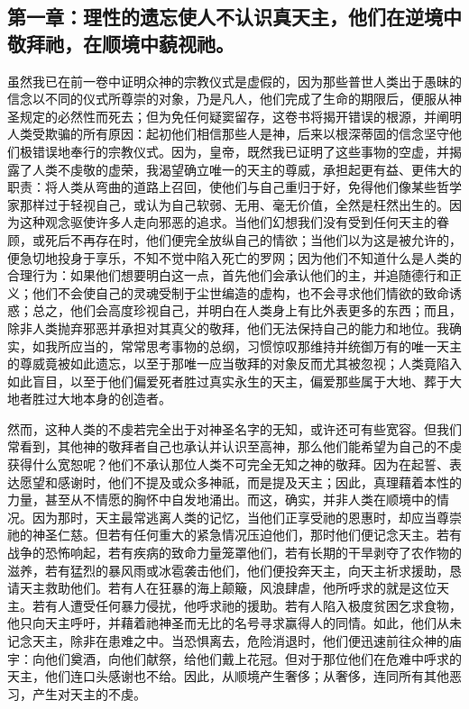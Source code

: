 \subsection{第一章：理性的遗忘使人不认识真天主，他们在逆境中敬拜祂，在顺境中藐视祂。}

虽然我已在前一卷中证明众神的宗教仪式是虚假的，因为那些普世人类出于愚昧的信念以不同的仪式所尊崇的对象，乃是凡人，他们完成了生命的期限后，便服从神圣规定的必然性而死去；但为免任何疑窦留存，这卷书将揭开错误的根源，并阐明人类受欺骗的所有原因：起初他们相信那些人是神，后来以根深蒂固的信念坚守他们极错误地奉行的宗教仪式。因为，皇帝，既然我已证明了这些事物的空虚，并揭露了人类不虔敬的虚荣，我渴望确立唯一的天主的尊威，承担起更有益、更伟大的职责：将人类从弯曲的道路上召回，使他们与自己重归于好，免得他们像某些哲学家那样过于轻视自己，或认为自己软弱、无用、毫无价值，全然是枉然出生的。因为这种观念驱使许多人走向邪恶的追求。当他们幻想我们没有受到任何天主的眷顾，或死后不再存在时，他们便完全放纵自己的情欲；当他们以为这是被允许的，便急切地投身于享乐，不知不觉中陷入死亡的罗网；因为他们不知道什么是人类的合理行为：如果他们想要明白这一点，首先他们会承认他们的主，并追随德行和正义；他们不会使自己的灵魂受制于尘世编造的虚构，也不会寻求他们情欲的致命诱惑；总之，他们会高度珍视自己，并明白在人类身上有比外表更多的东西；而且，除非人类抛弃邪恶并承担对其真父的敬拜，他们无法保持自己的能力和地位。我确实，如我所应当的，常常思考事物的总纲，习惯惊叹那维持并统御万有的唯一天主的尊威竟被如此遗忘，以至于那唯一应当敬拜的对象反而尤其被忽视；人类竟陷入如此盲目，以至于他们偏爱死者胜过真实永生的天主，偏爱那些属于大地、葬于大地者胜过大地本身的创造者。\par

然而，这种人类的不虔若完全出于对神圣名字的无知，或许还可有些宽容。但我们常看到，其他神的敬拜者自己也承认并认识至高神，那么他们能希望为自己的不虔获得什么宽恕呢？他们不承认那位人类不可完全无知之神的敬拜。因为在起誓、表达愿望和感谢时，他们不提及或众多神祇，而是提及天主；因此，真理藉着本性的力量，甚至从不情愿的胸怀中自发地涌出。而这，确实，并非人类在顺境中的情况。因为那时，天主最常逃离人类的记忆，当他们正享受祂的恩惠时，却应当尊崇祂的神圣仁慈。但若有任何重大的紧急情况压迫他们，那时他们便记念天主。若有战争的恐怖响起，若有疾病的致命力量笼罩他们，若有长期的干旱剥夺了农作物的滋养，若有猛烈的暴风雨或冰雹袭击他们，他们便投奔天主，向天主祈求援助，恳请天主救助他们。若有人在狂暴的海上颠簸，风浪肆虐，他所呼求的就是这位天主。若有人遭受任何暴力侵扰，他呼求祂的援助。若有人陷入极度贫困乞求食物，他只向天主呼吁，并藉着祂神圣而无比的名号寻求赢得人的同情。如此，他们从未记念天主，除非在患难之中。当恐惧离去，危险消退时，他们便迅速前往众神的庙宇：向他们奠酒，向他们献祭，给他们戴上花冠。但对于那位他们在危难中呼求的天主，他们连口头感谢也不给。因此，从顺境产生奢侈；从奢侈，连同所有其他恶习，产生对天主的不虔。\par


